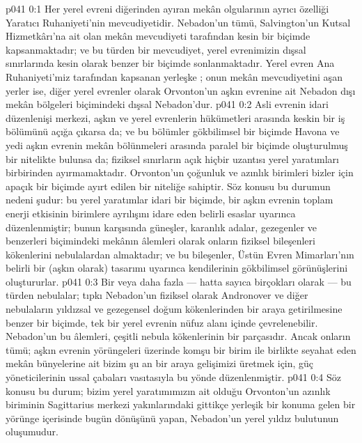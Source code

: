 \vs p041 0:1 Her yerel evreni diğerinden ayıran mekân olgularının ayrıcı özelliği Yaratıcı Ruhaniyeti’nin mevcudiyetidir. Nebadon’un tümü, Salvington’un Kutsal Hizmetkârı’na ait olan mekân mevcudiyeti tarafından kesin bir biçimde kapsanmaktadır; ve bu türden bir mevcudiyet, yerel evrenimizin dışsal sınırlarında kesin olarak benzer bir biçimde sonlanmaktadır. Yerel evren Ana Ruhaniyeti’miz tarafından kapsanan yerleşke ; onun mekân mevcudiyetini aşan yerler ise, diğer yerel evrenler olarak Orvonton’un aşkın evrenine ait Nebadon dışı mekân bölgeleri biçimindeki dışsal Nebadon’dur.
\vs p041 0:2 Asli evrenin idari düzenlenişi merkezi, aşkın ve yerel evrenlerin hükümetleri arasında keskin bir iş bölümünü açığa çıkarsa da; ve bu bölümler gökbilimsel bir biçimde Havona ve yedi aşkın evrenin mekân bölünmeleri arasında paralel bir biçimde oluşturulmuş bir nitelikte bulunsa da; fiziksel sınırların açık hiçbir uzantısı yerel yaratımları birbirinden ayırmamaktadır. Orvonton’un çoğunluk ve azınlık birimleri bizler için apaçık bir biçimde ayırt edilen bir niteliğe sahiptir. Söz konusu bu durumun nedeni şudur: bu yerel yaratımlar idari bir biçimde, bir aşkın evrenin toplam enerji etkisinin birimlere ayrılışını idare eden belirli  esaslar uyarınca düzenlenmiştir; bunun karşısında güneşler, karanlık adalar, gezegenler ve benzerleri biçimindeki mekânın âlemleri olarak onların fiziksel bileşenleri kökenlerini nebulalardan almaktadır; ve bu bileşenler, Üstün Evren Mimarları’nın belirli bir  (aşkın olarak) tasarımı uyarınca kendilerinin gökbilimsel görünüşlerini oluştururlar.
\vs p041 0:3 Bir veya daha fazla --- hatta sayıca birçokları olarak --- bu türden nebulalar; tıpkı Nebadon’un fiziksel olarak Andronover ve diğer nebulaların yıldızsal ve gezegensel doğum kökenlerinden bir araya getirilmesine benzer bir biçimde, tek bir yerel evrenin nüfuz alanı içinde çevrelenebilir. Nebadon’un bu âlemleri, çeşitli nebula kökenlerinin bir parçasıdır. Ancak onların tümü; aşkın evrenin yörüngeleri üzerinde komşu bir birim ile birlikte seyahat eden mekân bünyelerine ait bizim şu an bir araya gelişimizi üretmek için, güç yöneticilerinin ussal çabaları vasıtasıyla bu yönde düzenlenmiştir.
\vs p041 0:4 Söz konusu bu durum; bizim yerel yaratımımızın ait olduğu Orvonton’un azınlık biriminin Sagittarius merkezi yakınlarındaki gittikçe yerleşik bir konuma gelen bir yörünge içerisinde bugün dönüşünü yapan, Nebadon’un yerel yıldız bulutunun oluşumudur.
